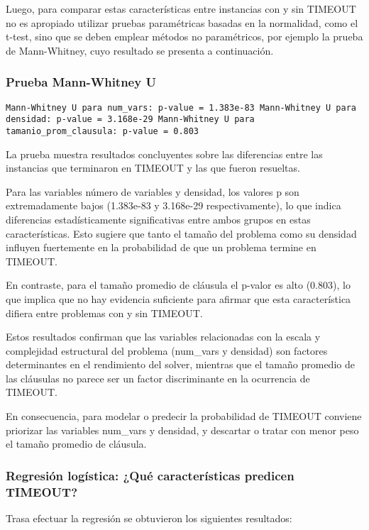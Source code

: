 Luego, para comparar estas características entre instancias con y sin TIMEOUT no es apropiado utilizar pruebas paramétricas basadas en la normalidad, como el t-test, sino que se deben emplear métodos no paramétricos, por ejemplo la prueba de Mann-Whitney, cuyo resultado se presenta a continuaci\'on. 

\subsubsection{Prueba Mann-Whitney U}

\texttt{Mann-Whitney U para num\_vars: p-value = 1.383e-83
Mann-Whitney U para densidad: p-value = 3.168e-29
Mann-Whitney U para tamanio\_prom\_clausula: p-value = 0.803}

La prueba muestra resultados concluyentes sobre las diferencias entre las instancias que terminaron en TIMEOUT y las que fueron resueltas.

Para las variables número de variables y densidad, los valores p son extremadamente bajos (1.383e-83 y 3.168e-29 respectivamente), lo que indica diferencias estadísticamente significativas entre ambos grupos en estas características. Esto sugiere que tanto el tamaño del problema como su densidad influyen fuertemente en la probabilidad de que un problema termine en TIMEOUT.

En contraste, para el tamaño promedio de cláusula el p-valor es alto (0.803), lo que implica que no hay evidencia suficiente para afirmar que esta característica difiera entre problemas con y sin TIMEOUT.

Estos resultados confirman que las variables relacionadas con la escala y complejidad estructural del problema (num\_vars y densidad) son factores determinantes en el rendimiento del solver, mientras que el tamaño promedio de las cláusulas no parece ser un factor discriminante en la ocurrencia de TIMEOUT.

En consecuencia, para modelar o predecir la probabilidad de TIMEOUT conviene priorizar las variables num\_vars y densidad, y descartar o tratar con menor peso el tamaño promedio de cláusula. 

\subsubsection{Regresi\'on log\'istica: ¿Qué características predicen TIMEOUT?}

Trasa efectuar la regresi\'on se obtuvieron los siguientes resultados:

